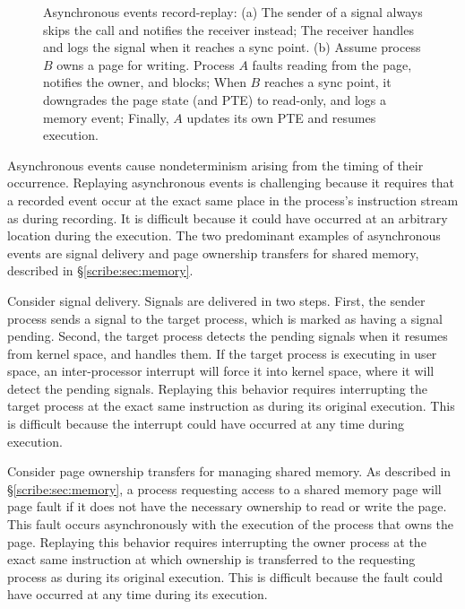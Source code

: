 \begin{figure}[t]
\begin{center}
\begin{tabular}{llll|l}
  \end{tabular}
  \end{center}

\vspace{-1em}
  \caption{Asynchronous events record-replay:
    { 
      (a) The sender of a signal always skips the call and notifies
      the receiver instead; The receiver handles and logs the signal
      when it reaches a sync point.
      (b) Assume process $B$ owns a page for writing. Process $A$
      faults reading from the page, notifies the owner, and blocks;
      When $B$ reaches a sync point, it downgrades the page state (and
      PTE) to read-only, and logs a memory event; Finally, $A$ updates
      its own PTE and resumes execution.
    }
  }

  \label{scribe:fig:recasync}
\end{figure}

Asynchronous events cause nondeterminism arising from the timing of
their occurrence.  Replaying asynchronous events is challenging
because it requires that a recorded event occur at the exact same
place in the process's instruction stream as during recording. It is
difficult because it could have occurred at an arbitrary location
during the execution. The two predominant examples of asynchronous
events are signal delivery and page ownership transfers for shared
memory, described in \S\ref{scribe:sec:memory}.

Consider signal delivery.  Signals are delivered in two steps.  First,
the sender process sends a signal to the target process, which is
marked as having a signal pending.  Second, the target process detects
the pending signals when it resumes from kernel space, and handles
them.  If the target process is executing in user space, an
inter-processor interrupt will force it into kernel space, where it 
will detect the pending signals.  Replaying this behavior requires
interrupting the target process at the exact same instruction as
during its original execution.  This is difficult because the
interrupt could have occurred at any time during execution.

Consider page ownership transfers for managing shared memory.  As
described in \S\ref{scribe:sec:memory}, a process requesting access to
a shared memory page will page fault if it does not have the necessary
ownership to read or write the page.  This fault occurs asynchronously
with the execution of the process that owns the page.  Replaying this
behavior requires interrupting the owner process at the exact same
instruction at which ownership is transferred to the requesting
process as during its original execution.  This is difficult because
the fault could have occurred at any time during its execution.

